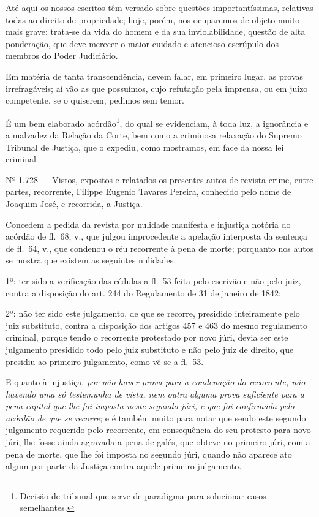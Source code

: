 Até aqui os nossos escritos têm versado sobre questões importantíssimas,
relativas todas ao direito de propriedade; hoje, porém, nos ocuparemos
de objeto muito mais grave: trata-se da vida do homem e da sua
inviolabilidade, questão de alta ponderação, que deve merecer o maior
cuidado e atencioso escrúpulo dos membros do Poder Judiciário.

Em matéria de tanta transcendência, devem falar, em primeiro lugar, as
provas irrefragáveis; aí vão as que possuímos, cujo refutação pela
imprensa, ou em juízo competente, se o quiserem, pedimos sem temor.

É um bem elaborado acórdão\footnote{Decisão de tribunal que serve de
  paradigma para solucionar casos semelhantes.}, do qual se evidenciam,
à toda luz, a ignorância e a malvadez da Relação da Corte, bem como a
criminosa relaxação do Supremo Tribunal de Justiça, que o expediu, como
mostramos, em face da nossa lei criminal.

Nº 1.728 --- Vistos, expostos e relatados os presentes autos de revista
crime, entre partes, recorrente, Filippe Eugenio Tavares Pereira,
conhecido pelo nome de Joaquim José, e recorrida, a Justiça.

Concedem a pedida da revista por nulidade manifesta e injustiça notória
do acórdão de fl.~68, v., que julgou improcedente a apelação interposta
da sentença de fl.~64, v., que condenou o réu recorrente à pena de
morte; porquanto nos autos se mostra que existem as seguintes nulidades.

1º: ter sido a verificação das cédulas a fl.~53 feita pelo escrivão e
não pelo juiz, contra a disposição do art. 244 do Regulamento de 31 de
janeiro de 1842;

2º: não ter sido este julgamento, de que se recorre, presidido
inteiramente pelo juiz substituto, contra a disposição dos artigos 457 e
463 do mesmo regulamento criminal, porque tendo o recorrente protestado
por novo júri, devia ser este julgamento presidido todo pelo juiz
substituto e não pelo juiz de direito, que presidiu ao primeiro
julgamento, como vê-se a fl.~53.

E quanto à injustiça, \emph{por não haver prova para a condenação do
recorrente, não havendo uma só testemunha de vista, nem outra alguma
prova suficiente para a pena capital que lhe foi imposta neste segundo
júri, e que foi confirmada pelo acórdão de que se recorre}; e é também
muito para notar que sendo este segundo julgamento requerido pelo
recorrente, em consequência do seu protesto para novo júri, lhe fosse
ainda agravada a pena de galés, que obteve no primeiro júri, com a pena
de morte, que lhe foi imposta no segundo júri, quando não aparece ato
algum por parte da Justiça contra aquele primeiro julgamento.

